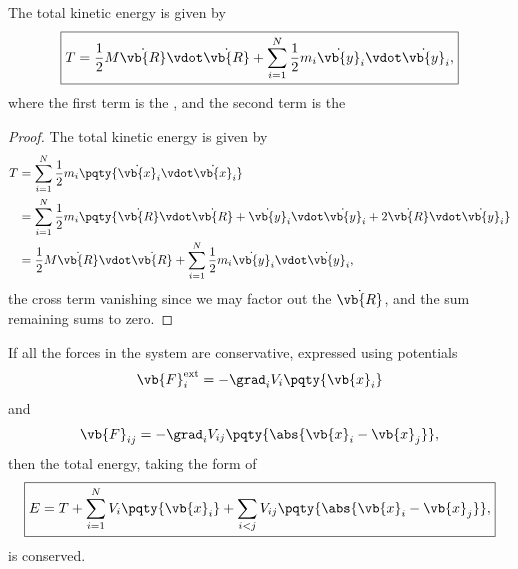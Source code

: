 \begin{proposition}
    \label{prop:system-energy-split}%
    The total kinetic energy is given by
    \begin{equation}
        \boxed{T = \frac{1}{2} M \dot{\vb{R}} \vdot \dot{\vb{R}} + \sum_{i = 1}^{N} \frac{1}{2} m_i \dot{\vb{y}}_i \vdot\dot{\vb{y}}_i,}
    \end{equation}
    where the first term is the , and the second term is the 
\end{proposition}

\begin{proof}
    The total kinetic energy is given by
    \begin{subequations}\begin{align}
        T &= \sum_{i = 1}^{N} \frac{1}{2} m_i \pqty{\dot{\vb{x}}_i \vdot \dot{\vb{x}}_i} \\
        &= \sum_{i = 1}^{N} \frac{1}{2} m_i \pqty{\dot{\vb{R}} \vdot \dot{\vb{R}} + \dot{\vb{y}}_i \vdot \dot{\vb{y}}_i + 2 \dot{\vb{R}} \vdot \dot{\vb{y}}_i} \\
        &= \frac{1}{2} M \dot{\vb{R}} \vdot \dot{\vb{R}} + \sum_{i = 1}^{N} \frac{1}{2} m_i \dot{\vb{y}}_i \vdot\dot{\vb{y}}_i,
    \end{align}\end{subequations}
    the cross term vanishing since we may factor out the \(\dot{\vb{R}}\), and the sum remaining sums to zero.
\end{proof}

\begin{proposition}
    \label{prop:conservative-force-conservative-energy}%
    If all the forces in the system are conservative, expressed using potentials
    \begin{equation}
        \vb{F}_i^{\text{ext}} = - \grad_i V_i \pqty{\vb{x}_i}
    \end{equation}
    and
    \begin{equation}
        \vb{F}_{ij} = - \grad_i V_{ij} \pqty{\abs{\vb{x}_i - \vb{x}_j}},
    \end{equation}
    then the total energy, taking the form of
    \begin{equation}
        \boxed{E = T + \sum_{i = 1}^{N} V_i \pqty{\vb{x}_i} + \sum_{i < j} V_{ij} \pqty{\abs{\vb{x}_i - \vb{x}_j}},}
    \end{equation}
    is conserved.
\end{proposition}

